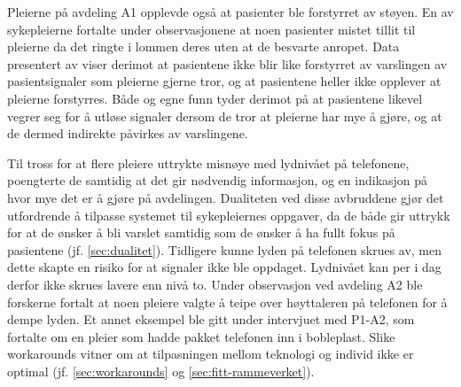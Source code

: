 \noindent
Pleierne på avdeling A1 opplevde også at pasienter ble forstyrret av støyen. En av sykepleierne fortalte under observasjonene at noen pasienter mistet tillit til pleierne da det ringte i lommen deres uten at de besvarte anropet. Data presentert av \citet{Rygh13} viser derimot at pasientene ikke blir like forstyrret av varslingen av pasientsignaler som pleierne gjerne tror, og at pasientene heller ikke opplever at pleierne forstyrres. Både \citet{Rygh13} og egne funn tyder derimot på at pasientene likevel vegrer seg for å utløse signaler dersom de tror at pleierne har mye å gjøre, og at de dermed indirekte påvirkes av varslingene.

\noindent
Til tross for at flere pleiere uttrykte misnøye med lydnivået på telefonene, poengterte de samtidig at det gir nødvendig informasjon, og en indikasjon på hvor mye det er å gjøre på avdelingen. Dualiteten ved disse avbruddene gjør det utfordrende å tilpasse systemet til sykepleiernes oppgaver, da de både gir uttrykk for at de ønsker å bli varslet samtidig som de ønsker å ha fullt fokus på pasientene (jf. \ref{sec:dualitet}). Tidligere kunne lyden på telefonen skrues av, men dette skapte en risiko for at signaler ikke ble oppdaget. Lydnivået kan per i dag derfor ikke skrues lavere enn nivå to. Under observasjon ved avdeling A2 ble forskerne fortalt at noen pleiere valgte å teipe over høyttaleren på telefonen for å dempe lyden. Et annet eksempel ble gitt under intervjuet med P1-A2, som fortalte om en pleier som hadde pakket telefonen inn i bobleplast. Slike workarounds vitner om at tilpasningen mellom teknologi og individ ikke er optimal (jf. \ref{sec:workarounds} og \ref{sec:fitt-rammeverket}).

